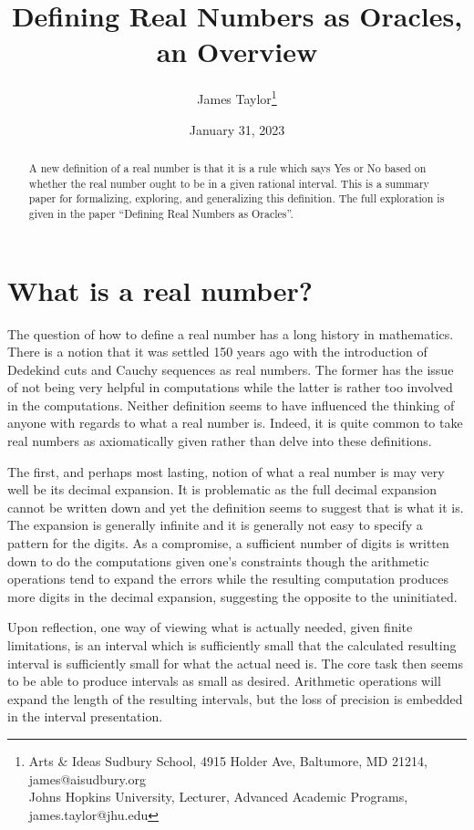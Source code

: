 \documentclass[12pt]{article}
\title{Defining Real Numbers as Oracles, an Overview}
\author{
  James Taylor\footnote{Arts \& Ideas Sudbury School, 4915 Holder Ave, Baltumore, MD 21214, james@aisudbury.org \\
  \hspace*{15px} Johns Hopkins University, Lecturer, Advanced Academic Programs, james.taylor@jhu.edu}
}
\date{January 31, 2023}
\theoremstyle{remark}
\begin{document}
\maketitle
\begin{abstract}
A new definition of a real number is that it is a rule which says Yes or No based on whether the real number ought to be in a given rational interval. This is a summary paper for formalizing, exploring, and generalizing this definition. The full exploration is given in the paper ``Defining Real Numbers as Oracles''. 
\end{abstract}



\section{What is a real number?}

The question of how to define a real number has a long history in mathematics. There is a notion that it was settled 150 years ago with the introduction of Dedekind cuts and Cauchy sequences as real numbers. The former has the issue of not being very helpful in computations while the latter is rather too involved in the computations. Neither definition seems to have influenced the thinking of anyone with regards to what a real number is. Indeed, it is quite common to take real numbers as axiomatically given rather than delve into these definitions.

The first, and perhaps most lasting, notion of what a real number is may very well be its decimal expansion. It is problematic as the full decimal expansion cannot be written down and yet the definition seems to suggest that is what it is. The expansion is generally infinite and it is generally not easy to specify a pattern for the digits. As a compromise, a sufficient number of digits is written down to do the computations given one's constraints though the arithmetic operations tend to expand the errors while the resulting computation produces more digits in the decimal expansion, suggesting the opposite to the uninitiated.

Upon reflection, one way of viewing what is actually needed, given finite limitations, is an interval which is sufficiently small that the calculated resulting interval is sufficiently small for what the actual need is. The core task then seems to be able to produce intervals as small as desired. Arithmetic operations will expand the length of the resulting intervals, but the loss of precision is embedded in the interval presentation. 
\end{document}
